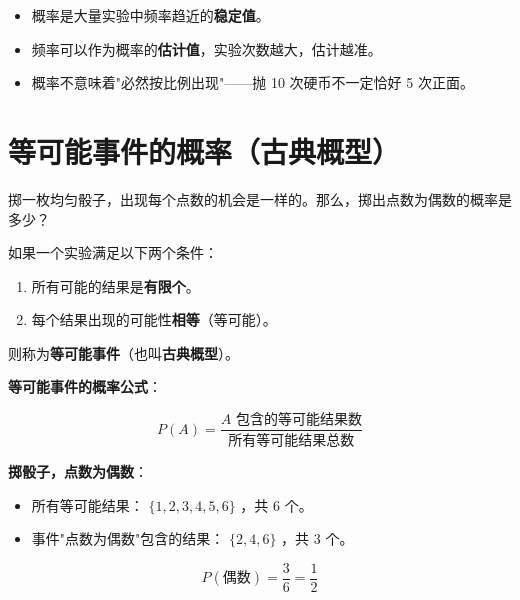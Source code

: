 \begin{keytakeaway}


\begin{itemize}
  \item 概率是大量实验中频率趋近的\textbf{稳定值}。
  \item 频率可以作为概率的\textbf{估计值}，实验次数越大，估计越准。
  \item 概率不意味着"必然按比例出现"——抛 10 次硬币不一定恰好 5 次正面。
\end{itemize}


\end{keytakeaway}



\section*{等可能事件的概率（古典概型）}


\begin{explore}


掷一枚均匀骰子，出现每个点数的机会是一样的。那么，掷出点数为偶数的概率是多少？

\end{explore}

\begin{understand}


如果一个实验满足以下两个条件：
\begin{enumerate}
  \item 所有可能的结果是\textbf{有限个}。
  \item 每个结果出现的可能性\textbf{相等}（等可能）。
\end{enumerate}


则称为\textbf{等可能事件}（也叫\textbf{古典概型}）。

\textbf{等可能事件的概率公式}：

\[
P(A) = \frac{A \text{ 包含的等可能结果数}}{\text{所有等可能结果总数}}
\]


\textbf{掷骰子，点数为偶数}：
\begin{itemize}
  \item 所有等可能结果： $\{1, 2, 3, 4, 5, 6\}$ ，共 $6$ 个。
  \item 事件"点数为偶数"包含的结果： $\{2, 4, 6\}$ ，共 $3$ 个。
\end{itemize}


\[
P(\text{偶数}) = \frac{3}{6} = \frac{1}{2}
\]


\end{understand}

